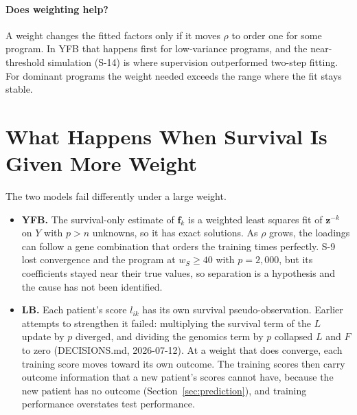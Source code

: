 \documentclass[11pt]{article}
\newcommand{\ws}{w_S}
\begin{document}
\paragraph{Does weighting help?} A weight changes the fitted factors only if it
moves $\rho$ to order one for some program. In YFB that happens first for
low-variance programs, and the near-threshold simulation (S-14) is where
supervision outperformed two-step fitting. For dominant programs the weight
needed exceeds the range where the fit stays stable.

\section{What Happens When Survival Is Given More Weight}\label{sec:upweight}

The two models fail differently under a large weight.

\begin{itemize}
  \item \textbf{YFB.} The survival-only estimate of $\bm f_k$ is a weighted least
        squares fit of $\bm z^{-k}$ on $Y$ with $p > n$ unknowns, so it has exact
        solutions. As $\rho$ grows, the loadings can follow a gene combination
        that orders the training times perfectly. S-9 lost convergence and the
        program at $\ws\ge 40$ with $p = 2{,}000$, but its coefficients stayed near
        their true values, so separation is a hypothesis and the cause has not
        been identified.
  \item \textbf{LB.} Each patient's score $l_{ik}$ has its own survival
        pseudo-observation. Earlier attempts to strengthen it failed:
        multiplying the survival term of the $L$ update by $p$ diverged, and
        dividing the genomics term by $p$ collapsed $L$ and $F$ to zero
        (DECISIONS.md, 2026-07-12). At a weight that does converge, each training
        score moves toward its own outcome. The training scores then carry
        outcome information that a new patient's scores cannot have, because the
        new patient has no outcome (Section~\ref{sec:prediction}), and training
        performance overstates test performance.
\end{itemize}
\end{document}
